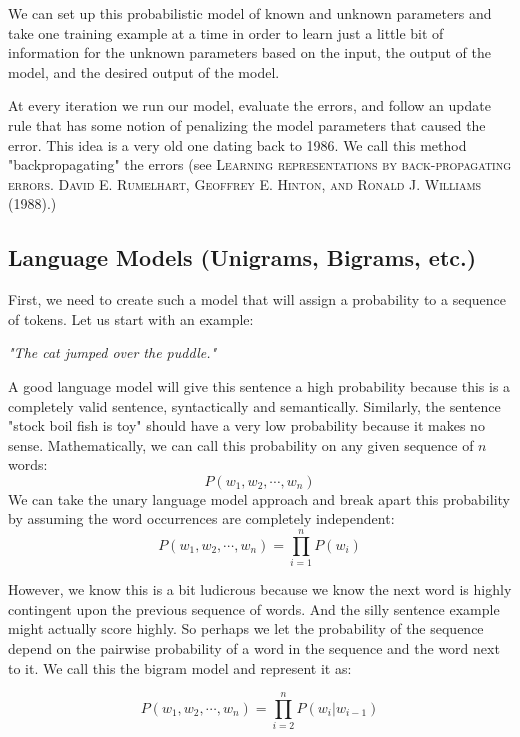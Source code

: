 \documentclass{tufte-handout}
\begin{document}
We can set up this probabilistic model of known and unknown parameters and take one training example at a time in order to learn just a little bit of information for the unknown parameters based on the input, the output of the model, and the desired output of the model.

At every iteration we run our model, evaluate the errors, and follow an update rule that has some notion of penalizing the model parameters that caused the error. This idea is a very old one dating back to 1986. We call this method "backpropagating" the errors (see \textsc{Learning representations by back-propagating errors. David E. Rumelhart, Geoffrey E. Hinton, and Ronald J. Williams (1988).})

\subsection{Language Models (Unigrams, Bigrams, etc.)}
First, we need to create such a model that will assign a probability to a sequence of tokens. Let us start with an example:

\begin{center}
\textit{"The cat jumped over the puddle."}
\end{center}

A good language model will give this sentence a high probability because this is a completely valid sentence, syntactically and semantically. Similarly, the sentence "stock boil fish is toy" should have a very low probability because it makes no sense. Mathematically, we can call this probability on any given sequence of $n$ words:
$$P(w_{1}, w_{2}, \cdots, w_{n})$$
We can take the unary language model approach and break apart this probability by assuming the word occurrences are completely independent:
$$P(w_{1}, w_{2}, \cdots, w_{n}) = \prod_{i=1}^n P(w_{i})$$


However, we know this is a bit ludicrous because we know the next word is highly contingent upon the previous sequence of words. And the silly sentence example might actually score highly. So perhaps we let the probability of the sequence depend on the pairwise probability of a word in the sequence and the word next to it. We call this the bigram model and represent it as:

$$P(w_{1}, w_{2}, \cdots, w_{n}) = \prod_{i=2}^n P(w_{i} | w_{i-1})$$
\end{document}
